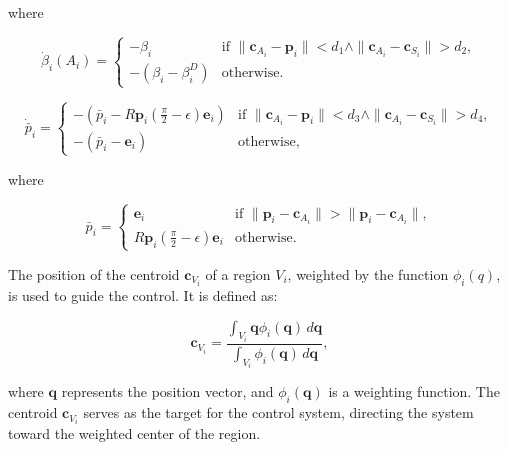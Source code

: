         where
        
        \begin{equation}
            \dot{\beta}_i(A_i) = 
            \begin{cases}
                -\beta_i & \text{if } \|\mathbf{c}_{A_i} - \mathbf{p}_i\| < d_1 \land \|\mathbf{c}_{A_i} - \mathbf{c}_{S_i}\| > d_2, \\
                -(\beta_i - \beta_i^D) & \text{otherwise.}
            \end{cases} \tag{8}
        \end{equation}
        
        \begin{equation}
            \dot{\bar{p}}_i = 
            \begin{cases}
                -(\bar{p}_i - R\mathbf{p}_i (\frac{\pi}{2} - \epsilon) \mathbf{e}_i) & \text{if } \|\mathbf{c}_{A_i} - \mathbf{p}_i\| < d_3 \land \|\mathbf{c}_{A_i} - \mathbf{c}_{S_i}\| > d_4, \\
                -(\bar{p}_i - \mathbf{e}_i) & \text{otherwise,}
            \end{cases}
        \end{equation}
        
        where 
        
        \[
        \bar{p}_i = 
        \begin{cases}
        \mathbf{e}_i & \text{if } \|\mathbf{p}_i - \mathbf{c}_{A_i}\| > \|\mathbf{p}_i - \mathbf{c}_{A_i}\|, \\
        R\mathbf{p}_i (\frac{\pi}{2} - \epsilon) \mathbf{e}_i & \text{otherwise.}
        \end{cases}
        \]
            

        
        The position of the centroid \( \mathbf{c}_{V_i} \) of a region \( V_i \), weighted by the function \( \phi_i(q) \), is used to guide the control. It is defined as:

        \begin{equation}
            \mathbf{c}_{V_i} = \frac{\int_{V_i} \mathbf{q} \phi_i(\mathbf{q}) \, d\mathbf{q}}{\int_{V_i} \phi_i(\mathbf{q}) \, d\mathbf{q}},
        \end{equation}

        where \( \mathbf{q} \) represents the position vector, and \( \phi_i(\mathbf{q}) \) is a weighting function. The centroid \( \mathbf{c}_{V_i} \) serves as the target for the control system, directing the system toward the weighted center of the region.




